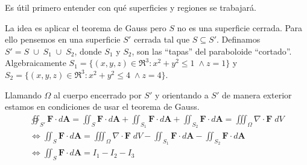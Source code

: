 \newpage
\begin{solution}
    Es \'util primero entender con qu\'e superficies y regiones se trabajar\'a.
    \begin{center}
    \end{center}

    La idea es aplicar el teorema de Gauss pero  $S$ no es una superficie cerrada.   Para ello pensemos en una superficie $S'$  cerrada tal  que $S \subseteq S'.$  Definamos   $S'=S\;\cup\;S_1\;\cup\;S_2$,  donde $S_1$ y $S_2$, son las ``tapas'' del paraboloide ``cortado''.  Algebraicamente $S_1=\{(x,y,z)\in \Re^3 : x^2+y^2\le 1\;\land z=1\}$ y $S_2=\{(x,y,z)\in \Re^3 : x^2+y^2\le4\;\land z=4\}$.

    Llamando  $\Omega$  al cuerpo encerrado por $S'$ y orientando a $S'$ de manera exterior estamos en condiciones de usar el teorema de Gauss.
    \begin{gather*}
        \oiint _{S'} \mathbf{F}\cdot d\mathbf{A} =
        \iint _{S} \mathbf{F}\cdot d\mathbf{A} +
        \iint _{S_1} \mathbf{F}\cdot d\mathbf{A} +
        \iint _{S_2} \mathbf{F}\cdot d\mathbf{A}
        =\iiint _\Omega \nabla \cdot \mathbf{F}\;dV\\[.2cm]
        \iff \iint _{S} \mathbf{F}\cdot d\mathbf{A} =
        \iiint _\Omega \nabla \cdot \mathbf{F}\;dV -
        \iint _{S_1} \mathbf{F}\cdot d\mathbf{A} -
        \iint _{S_2} \mathbf{F}\cdot d\mathbf{A}\\[.2cm]
        \iff \iint _{S} \mathbf{F}\cdot d\mathbf{A} =
        I_1-I_2-I_3
    \end{gather*}


\end{solution}
